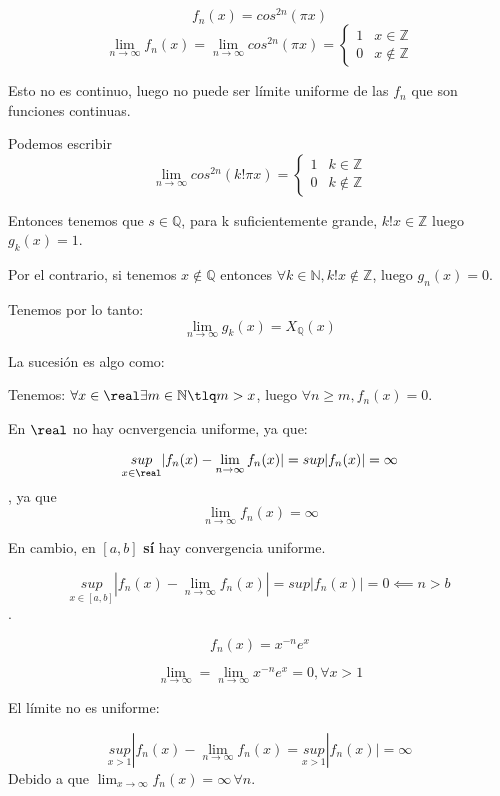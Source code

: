 \documentclass[nochap]{apuntes}
\begin{document}
\begin{problem}[5]
\[f_n(x) = cos^{2n}(\pi x)\]
\solution
\spart
\[\lim_{n\to\infty}f_n(x) = \lim_{n\to\infty}cos^{2n}(\pi x) =\left\{
\begin{array}{cc}
1&x\in\mathbb{Z}\\
0&x\notin\mathbb{Z}
\end{array}\right. \]

Esto no es  continuo, luego no puede ser límite uniforme de las $f_n$ que son funciones continuas.

\spart
Podemos escribir 
\[\lim_{n\to\infty} cos^{2n}(k! \pi x) = \left\{ \begin{array}{cc}1&k\in\mathbb{Z}\\0&k\notin\mathbb{Z}\end{array}\right.\]

Entonces tenemos que $s\in\mathbb{Q}$, para k suficientemente grande, $k!x\in\mathbb{Z}$ luego $g_k(x) = 1$.

Por el contrario, si tenemos $x\notin\mathbb{Q}$ entonces $\forall k\in\mathbb{N}, k!x\notin \mathbb{Z}$, luego $g_n(x) = 0$.

Tenemos por lo tanto: \[\lim_{n\to\infty} g_k(x) = X_{\mathbb{Q}}(x)\]

\spart[d]
La sucesión es algo como:


Tenemos: $\forall x\in\real \exists m\in\mathbb{N} \tlq m>x$, luego $\forall n\ge m, f_n(x) = 0$.

En $\real$ no hay ocnvergencia uniforme, ya que:

\[\underset{x\in\real}{sup }|f_n(x) - \lim_{n\to\infty} f_n(x)| = sup |f_n(x)| = \infty\], ya que 
\[\lim_{n\to\infty}f_n(x) = \infty\]

En cambio, en $[a,b]$ \textbf{sí} hay convergencia uniforme.

\[\underset{x\in[a,b]}{sup }|f_n(x) - \lim_{n\to\infty} f_n(x)| = sup |f_n(x)| = 0 \impliedby n>b \].

\spart[f] \[f_n(x) = x^{-n}e^x\]

\[\lim_{n\to\infty} = \lim_{n\to\infty} x^{-n}e^x = 0, \forall x>1\]

El límite no es uniforme:

\[\underset{x>1}{sup }|f_n(x) - \lim_{n\to\infty}f_n(x) =\underset{x>1}{sup }|f_n(x)| = \infty \]Debido a que $\lim_{x\to\infty}f_n(x) = \infty \,\forall n$.
\end{problem}
\end{document}

